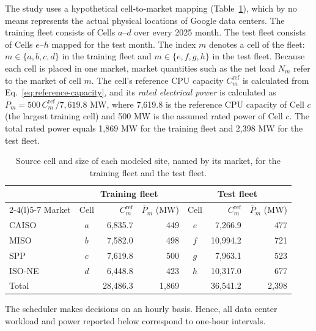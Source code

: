 \documentclass{UNCC-thesis}
\begin{document}
The study uses a hypothetical cell-to-market mapping
(Table~\ref{tab:active-market-map}), which by no means represents the actual physical
locations of Google data centers. The training fleet consists of Cells \(a\)--\(d\) over
every 2025 month. The test fleet consists of Cells \(e\)--\(h\) mapped for the test month.
The index \(m\) denotes a cell of the fleet: \(m\in\{a,b,c,d\}\) in the training fleet and
\(m\in\{e,f,g,h\}\) in the test fleet. Because each cell is placed in one market, market
quantities such as the net load \(N_m\) refer to the market of cell \(m\).
The cell's reference CPU capacity \(C^{\mathrm{ref}}_m\) is calculated from
Eq.~\eqref{eq:reference-capacity}, and its \emph{rated electrical power} is
calculated as \(\overline P_m=500\,C^{\mathrm{ref}}_m/7{,}619.8\) MW, where 7,619.8
is the reference CPU capacity of Cell \(c\) (the largest training cell) and 500 MW
is the assumed rated power of Cell \(c\). The total rated power equals 1,869 MW
for the training fleet and 2,398 MW for the test fleet.

\begin{table}[htbp]
  \centering
  \footnotesize
  \caption[Source cell and size of each modeled site]{Source cell and size of each modeled site, named by its market,
  for the training fleet and the test fleet.}
  \label{tab:active-market-map}
  \begin{tabular}{@{}lcrrcrr@{}}
    \toprule
    & \multicolumn{3}{c}{Training fleet} & \multicolumn{3}{c}{Test fleet} \\
    \cmidrule(lr){2-4}\cmidrule(l){5-7}
    Market & Cell & \(C^{\mathrm{ref}}_m\) & \(\overline P_m\) (MW)
                & Cell & \(C^{\mathrm{ref}}_m\) & \(\overline P_m\) (MW) \\
    \midrule
    CAISO          & \(a\) & 6,835.7 & 449 & \(e\) & 7,266.9 & 477 \\
    MISO           & \(b\) & 7,582.0 & 498 & \(f\) & 10,994.2 & 721 \\
    SPP            & \(c\) & 7,619.8 & 500 & \(g\) & 7,963.1 & 523 \\
    ISO-NE         & \(d\) & 6,448.8 & 423 & \(h\) & 10,317.0 & 677 \\
    \addlinespace
    Total          &       & 28,486.3 & 1,869 &     & 36,541.2 & 2,398 \\
    \bottomrule
  \end{tabular}
\end{table}

The scheduler makes decisions on an hourly basis. Hence, all data center
workload and power reported below correspond to one-hour intervals.
\end{document}
